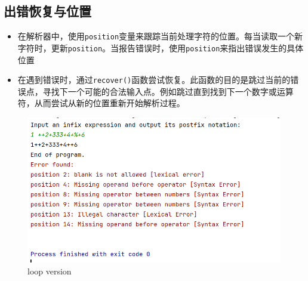 \documentclass{article}
\begin{document}
\subsection{出错恢复与位置}
\begin{itemize}
    \item 在解析器中，使用\texttt{position}变量来跟踪当前处理字符的位置。每当读取一个新字符时，更新\texttt{position}。当报告错误时，使用\texttt{position}来指出错误发生的具体位置
    \item 在遇到错误时，通过\texttt{recover()}函数尝试恢复。此函数的目的是跳过当前的错误点，寻找下一个可能的合法输入点。例如跳过直到找到下一个数字或运算符，从而尝试从新的位置重新开始解析过程。
\end{itemize}


\begin{figure}[H]
    \includegraphics[width=\textwidth]{element/11.png}
    \caption{loop version}
\end{figure}
\end{document}
